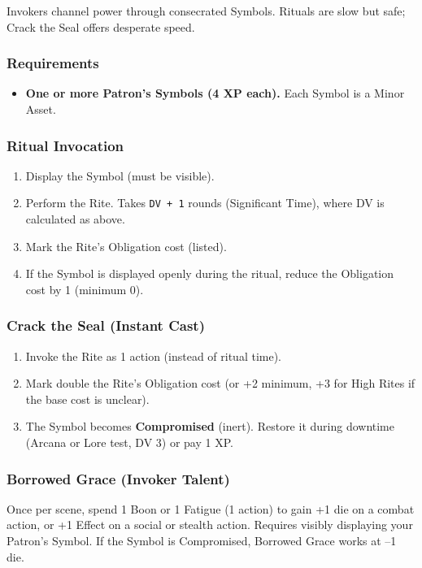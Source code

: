 Invokers channel power through consecrated Symbols. Rituals are slow but safe; Crack the Seal offers desperate speed.

\subsubsection{Requirements}
\begin{itemize}
  \item \textbf{One or more Patron's Symbols (4 XP each).} Each Symbol is a Minor Asset.
\end{itemize}

\subsubsection{Ritual Invocation}
\begin{enumerate}
  \item Display the Symbol (must be visible).
  \item Perform the Rite. Takes \texttt{DV + 1} rounds (Significant Time), where DV is calculated as above.
  \item Mark the Rite's Obligation cost (listed).
  \item If the Symbol is displayed openly during the ritual, reduce the Obligation cost by 1 (minimum 0).
\end{enumerate}

\subsubsection{Crack the Seal (Instant Cast)}
\begin{enumerate}
  \item Invoke the Rite as 1 action (instead of ritual time).
  \item Mark double the Rite's Obligation cost (or +2 minimum, +3 for High Rites if the base cost is unclear).
  \item The Symbol becomes \textbf{Compromised} (inert). Restore it during downtime (Arcana or Lore test, DV 3) or pay 1 XP.
\end{enumerate}

\subsubsection{Borrowed Grace (Invoker Talent)}
Once per scene, spend 1 Boon or 1 Fatigue (1 action) to gain +1 die on a combat action, or +1 Effect on a social or stealth action. Requires visibly displaying your Patron's Symbol. If the Symbol is Compromised, Borrowed Grace works at --1 die.

